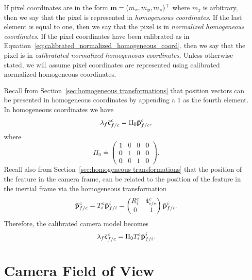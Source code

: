 If pixel coordinates are in the form $\mathbf{m} = (m_x, m_y, m_z)^\top$ where $m_z$ is arbitrary, then we say that the pixel is represented in {\em homogeneous coordinates}.  If the last element is equal to one, then we say that the pixel is in {\em normalized homogeneous coordinates}. If the pixel coordinates have been calibrated as in Equation~\eqref{eq:calibrated_normalized_homogeneous_coord}, then we say that the pixel is in {\em calibratated normalized homogeneous coordinates}.
%
Unless otherwise stated, we will assume pixel coordinates are represented using calibrated normalized homogeneous coordinates.

Recall from Section~\ref{sec:homogeneous transformations} that position vectors can be presented in homogeneous coordinates by appending a $1$ as the fourth element.  In homogeneous coordinates we have\cite{MaSoattoKoseckaSastry03}
\[
\lambda_f \bar{\boldsymbol{\epsilon}}_{f/c}^c = \Pi_0\bar{\mathbf{p}}_{f/c}^c,
\]
where
\[
\Pi_0 \doteq \begin{pmatrix} 1 & 0 & 0 & 0 \\ 0 & 1 & 0 & 0 \\ 0 & 0 & 1 & 0 \end{pmatrix}.
\]
Recall also from Section~\ref{sec:homogeneous transformations} that the position of the feature in the camera frame, can be related to the position of the feature in the inertial frame via the homogeneous transformation
\[
\bar{\mathbf{p}}_{f/c}^c = T_i^c \bar{\mathbf{p}}_{f/i}^i = \begin{pmatrix} R_i^c & \mathbf{t}_{i/c}^c \\ 0 & 1 \end{pmatrix} \bar{\mathbf{p}}_{f/i}^i.
\]
Therefore, the calibrated camera model becomes
\begin{equation}\label{eq:pin_hole_calibrated}
\lambda_f \bar{\epsilonbf}_{f/c}^c = \Pi_0 T_i^c \bar{\pbf}_{f/i}^i.
\end{equation}

\section{Camera Field of View}
\label{sec:field_of_view}

